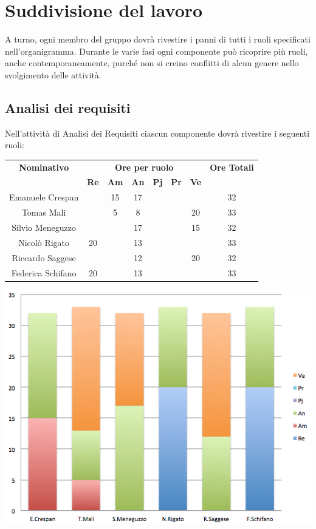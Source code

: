 \section{Suddivisione del lavoro}
A turno, ogni membro del gruppo dovrà rivestire i panni di tutti i
ruoli specificati nell'organigramma. Durante le varie fasi
ogni componente può ricoprire più ruoli, anche contemporaneamente,
purché non si creino conflitti di alcun genere nello svolgimento delle
attività. 

\subsection{Analisi dei requisiti}
Nell’attività di Analisi dei Requisiti ciascun componente dovrà rivestire i seguenti ruoli:

\begin{center}
  \centering
  \begin{tabular} {|c|c|c|c|c|c|c|c|}
    \hline
    \textbf{Nominativo} & \multicolumn{6}{|c|}{\textbf{Ore per ruolo}} & \textbf{Ore Totali} \\
    & \textbf{Re} & \textbf{Am} & \textbf{An} & \textbf{Pj} & \textbf{Pr} & \textbf{Ve} & \\
    \hline
    Emanuele Crespan & & 15 & 17 & & & & 32\\
    \hline
    Tomas Mali &  & 5 & 8 & & & 20 & 33\\
    \hline
    Silvio Meneguzzo & & & 17 & & & 15 & 32\\
    \hline
    Nicolò Rigato & 20 & & 13 & & &  & 33\\
    \hline
    Riccardo Saggese & & & 12 & & & 20 & 32\\
    \hline
    Federica Schifano & 20 & & 13 & & & & 33\\
    \hline
  \end{tabular}
  \includegraphics[scale=0.65]{img/fig1.png}
\end{center}

